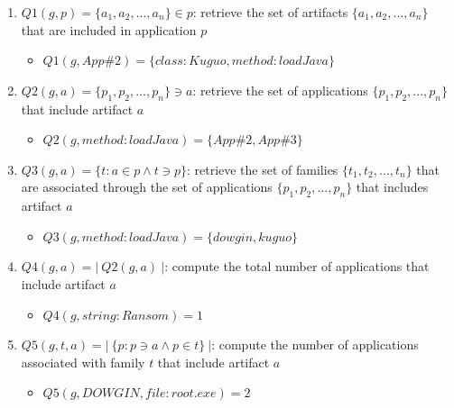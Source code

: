 \begin{enumerate}
	\item $Q1(\mathit{g}, \mathit{p}) = \{\mathit{a}_1, \mathit{a}_2, ..., \mathit{a}_n\} \in \mathit{p}$: retrieve the set of artifacts $\{\mathit{a}_1, \mathit{a}_2, ..., \mathit{a}_n\}$ that are included in application $\mathit{p}$
	      \begin{itemize}
		      \item {\small $Q1(\mathit{g}, App \#2) = \{class:Kuguo, method:loadJava\}$}
	      \end{itemize}
	\item $Q2(\mathit{g}, \mathit{a}) = \{\mathit{p}_1, \mathit{p}_2, ..., \mathit{p}_n\} \ni \mathit{a}$: retrieve the set of applications $\{\mathit{p}_1, \mathit{p}_2, ..., \mathit{p}_n\}$ that include artifact $\mathit{a}$
	      \begin{itemize}
		      \item {\small $Q2(\mathit{g}, method:loadJava) = \{App \#2, App \#3\}$}
	      \end{itemize}
	\item $Q3(\mathit{g}, \mathit{a}) = \{\mathit{t} : \mathit{a} \in \mathit{p} \land \mathit{t} \ni \mathit{p} \}$: retrieve the set of families $\{\mathit{t}_1, \mathit{t}_2, ..., \mathit{t}_n\}$ that are associated through the set of applications $\{\mathit{p}_1, \mathit{p}_2, ..., \mathit{p}_n\}$ that includes artifact $\mathit{a}$
	      \begin{itemize}
		      \item {\small $Q3(\mathit{g}, method:loadJava) = \{\textit{dowgin}, \textit{kuguo}\}$}
	      \end{itemize}
	\item $Q4(\mathit{g}, \mathit{a}) = |\ Q2(\mathit{g}, \mathit{a})\ |$: compute the total number of applications that include artifact $\mathit{a}$
	      \begin{itemize}
		      \item {\small $Q4(\mathit{g}, string:Ransom) = 1$}
	      \end{itemize}
	\item $Q5(\mathit{g}, \mathit{t}, \mathit{a}) = |\ \{\mathit{p} : \mathit{p} \ni \mathit{a} \land \mathit{p} \in \mathit{t} \}\ | $: compute the number of applications associated with family $\mathit{t}$ that include artifact $\mathit{a}$
	      \begin{itemize}
		      \item {\small $Q5(\mathit{g}, DOWGIN, file:root.exe) = 2$}
	      \end{itemize}
\end{enumerate}

